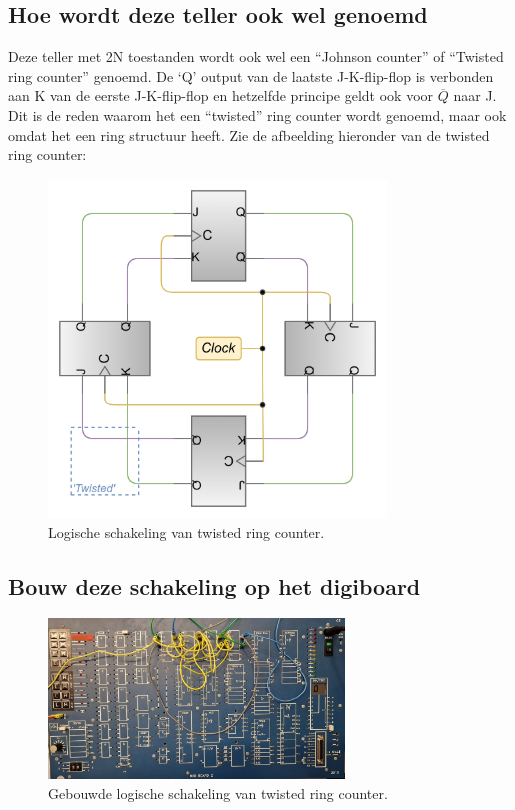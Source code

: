 \documentclass[12pt]{article}
\begin{document}
\subsection{Hoe wordt deze teller ook wel genoemd}
Deze teller met 2N toestanden wordt ook wel een ``Johnson counter'' of ``Twisted ring counter'' genoemd. De `Q' output van de laatste J-K-flip-flop is verbonden aan K van de eerste J-K-flip-flop en hetzelfde principe geldt ook voor $\overline{Q}$ naar J. 
Dit is de reden waarom het een ``twisted'' ring counter wordt genoemd, maar ook omdat het een ring structuur heeft. Zie de afbeelding hieronder van de twisted ring counter:
\begin{figure}[h]
    \centering
    \includegraphics[width=0.8\textwidth]{johnring.png}
    \caption{Logische schakeling van twisted ring counter.}
    \label{fig:john2}
\end{figure}
\pagebreak 
\subsection{Bouw deze schakeling op het digiboard}
\begin{figure}[h]
    \centering
    \includegraphics[width=0.7\textwidth]{1jc.jpg}
    \caption{Gebouwde logische schakeling van twisted ring counter.}
    \label{fig:john11}
\end{figure} 
\end{document}
